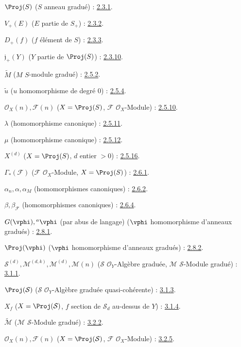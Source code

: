 $\Proj(S)$ ($S$ anneau gradué) : \hyperref[II.2.3.1-fr]{2.3.1}.

$V_+(E)$ ($E$ partie de $S_+$) : \hyperref[II.2.3.2-fr]{2.3.2}.

$D_+(f)$ ($f$ élément de $S$) : \hyperref[II.2.3.3-fr]{2.3.3}.

$\mathfrak j_+(Y)$ ($Y$ partie de $\Proj(S)$) : \hyperref[II.2.3.10-fr]{2.3.10}.

$\widetilde M$ ($M$ $S$-module gradué) : \hyperref[II.2.5.2-fr]{2.5.2}.

$\widetilde u$ ($u$ homomorphisme de degré $0$) : \hyperref[II.2.5.4-fr]{2.5.4}.

$\mathcal{O}_X(n),\mathcal{F}(n)$
($X=\Proj(S)$, $\mathcal{F}$ $\mathcal{O}_X$-Module) : \hyperref[II.2.5.10-fr]{2.5.10}.

$\lambda$ (homomorphisme canonique) : \hyperref[II.2.5.11-fr]{2.5.11}.

$\mu$ (homomorphisme canonique) : \hyperref[II.2.5.12-fr]{2.5.12}.

$X^{(d)}$ ($X=\Proj(S)$, $d$ entier $>0$) : \hyperref[II.2.5.16-fr]{2.5.16}.

$\Gamma_*(\mathcal{F})$ ($\mathcal{F}$ $\mathcal{O}_X$-Module,
$X=\Proj(S)$) : \hyperref[II.2.6.1-fr]{2.6.1}.

$\alpha_n,\alpha,\alpha_M$ (homomorphismes canoniques) : \hyperref[II.2.6.2-fr]{2.6.2}.

$\beta,\beta_{\mathcal{F}}$ (homomorphismes canoniques) : \hyperref[II.2.6.4-fr]{2.6.4}.

$G(\vphi),{}^a\vphi$ (par abus de langage)
($\vphi$ homomorphisme d'anneaux gradués) : \hyperref[II.2.8.1-fr]{2.8.1}.

$\Proj(\vphi)$ ($\vphi$ homomorphisme d'anneaux gradués) : \hyperref[II.2.8.2-fr]{2.8.2}.

$\mathcal{S}^{(d)},\mathcal{M}^{(d,k)},\mathcal{M}^{(d)},\mathcal{M}(n)$
($\mathcal{S}$ $\mathcal{O}_Y$-Algèbre graduée,
$\mathcal{M}$ $\mathcal{S}$-Module gradué) : \hyperref[II.3.1.1-fr]{3.1.1}.

$\Proj(\mathcal{S})$ ($\mathcal{S}$ $\mathcal{O}_Y$-Algèbre graduée quasi-cohérente) : \hyperref[II.3.1.3-fr]{3.1.3}.

$X_f$ ($X=\Proj(\mathcal{S})$, $f$ section de $\mathcal{S}_d$ au-dessus de $Y$) : \hyperref[II.3.1.4-fr]{3.1.4}.

$\widetilde{\mathcal{M}}$ ($\mathcal{M}$ $\mathcal{S}$-Module gradué) : \hyperref[II.3.2.2-fr]{3.2.2}.

$\mathcal{O}_X(n),\mathcal{F}(n)$
($X=\Proj(\mathcal{S})$, $\mathcal{F}$ $\mathcal{O}_X$-Module) : \hyperref[II.3.2.5-fr]{3.2.5}.

